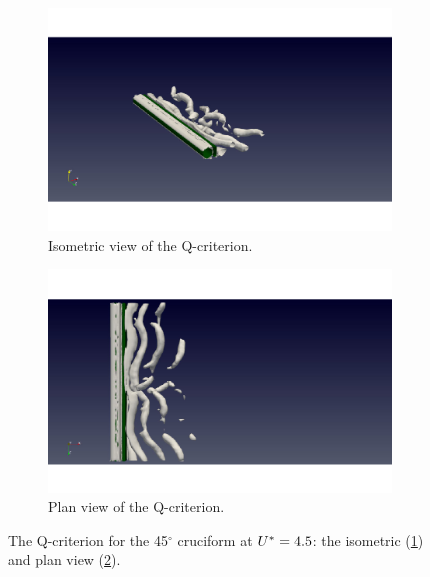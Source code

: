 \documentclass[oneside]{utmthesis}
\begin{document}
\begin{figure}
  \centering
  \begin{subfigure}[h]{0.9\textwidth}
    \includegraphics[width=\textwidth]{figs/qIso000U02}
    \caption{Isometric view of the Q-criterion.}
    \label{fig:qIso000U02}
  \end{subfigure}

  \begin{subfigure}[h]{0.9\textwidth}
    \includegraphics[width=\textwidth]{figs/qTop000U02}
    \caption{Plan view of the Q-criterion.}
    \label{fig:qTop000U02}
  \end{subfigure}

  \caption{The Q-criterion for the 45$^{\circ}$ cruciform at $U^{*} = 4.5$: the isometric (\ref{fig:qIso000U02}) and plan view (\ref{fig:qTop000U02}).} \label{fig:qCrit000U02}
\end{figure}
\end{document}
